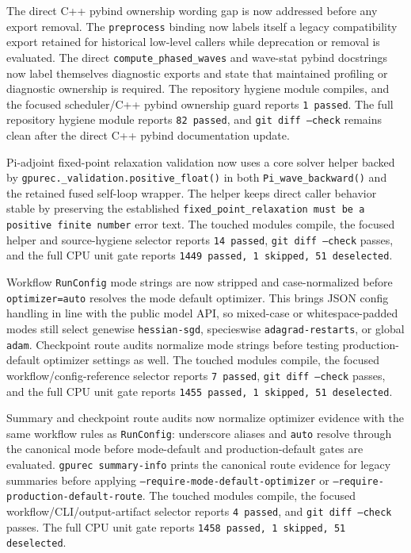 \documentclass[11pt]{article}
\begin{document}
The direct C++ pybind ownership wording gap is now addressed before any export
removal.  The \texttt{preprocess} binding now labels itself a legacy
compatibility export retained for historical low-level callers while
deprecation or removal is evaluated.  The direct
\texttt{compute\_phased\_waves} and wave-stat pybind docstrings now label
themselves diagnostic exports and state that maintained profiling or diagnostic
ownership is required.
The repository hygiene module compiles, and the focused scheduler/C++ pybind
ownership guard reports \texttt{1 passed}.
The full repository hygiene module reports \texttt{82 passed}, and
\texttt{git diff --check} remains clean after the direct C++ pybind
documentation update.

Pi-adjoint fixed-point relaxation validation now uses a core solver helper
backed by \texttt{gpurec.\_validation.positive\_float()} in both
\texttt{Pi\_wave\_backward()} and the retained fused self-loop wrapper.  The
helper keeps direct caller behavior stable by preserving the established
\texttt{fixed\_point\_relaxation must be a positive finite number} error text.
The touched modules compile, the focused helper and source-hygiene selector
reports \texttt{14 passed}, \texttt{git diff --check} passes, and the full CPU
unit gate reports \texttt{1449 passed, 1 skipped, 51 deselected}.

Workflow \texttt{RunConfig} mode strings are now stripped and case-normalized
before \texttt{optimizer=auto} resolves the mode default optimizer.  This
brings JSON config handling in line with the public model API, so
mixed-case or whitespace-padded modes still select genewise
\texttt{hessian-sgd}, specieswise \texttt{adagrad-restarts}, or global
\texttt{adam}.  Checkpoint route audits normalize mode strings before testing
production-default optimizer settings as well.  The touched modules compile,
the focused workflow/config-reference selector reports \texttt{7 passed},
\texttt{git diff --check} passes, and the full CPU unit gate reports
\texttt{1455 passed, 1 skipped, 51 deselected}.

Summary and checkpoint route audits now normalize optimizer evidence with the
same workflow rules as \texttt{RunConfig}: underscore aliases and
\texttt{auto} resolve through the canonical mode before mode-default and
production-default gates are evaluated.  \texttt{gpurec summary-info} prints the
canonical route evidence for legacy summaries before applying
\texttt{--require-mode-default-optimizer} or
\texttt{--require-production-default-route}.  The touched modules compile, the
focused workflow/CLI/output-artifact selector reports \texttt{4 passed}, and
\texttt{git diff --check} passes.  The full CPU unit gate reports
\texttt{1458 passed, 1 skipped, 51 deselected}.
\end{document}
